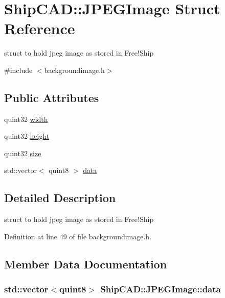 \hypertarget{structShipCAD_1_1JPEGImage}{\section{Ship\-C\-A\-D\-:\-:J\-P\-E\-G\-Image Struct Reference}
\label{structShipCAD_1_1JPEGImage}
}


struct to hold jpeg image as stored in Free!\-Ship  




{\ttfamily \#include $<$backgroundimage.\-h$>$}

\subsection*{Public Attributes}
\begin{DoxyCompactItemize}
\item 
quint32 \hyperlink{structShipCAD_1_1JPEGImage_aef2620e748540276be24c0275620870b}{width}
\item 
quint32 \hyperlink{structShipCAD_1_1JPEGImage_a35650ffa91785a63ba6f31cd87e208a2}{height}
\item 
quint32 \hyperlink{structShipCAD_1_1JPEGImage_a7e28010a6fb1d0c2926f8381b2e29931}{size}
\item 
std\-::vector$<$ quint8 $>$ \hyperlink{structShipCAD_1_1JPEGImage_aa1ec94e32147a6e39de7809b45604e21}{data}
\end{DoxyCompactItemize}


\subsection{Detailed Description}
struct to hold jpeg image as stored in Free!\-Ship 

Definition at line 49 of file backgroundimage.\-h.



\subsection{Member Data Documentation}
\hypertarget{structShipCAD_1_1JPEGImage_aa1ec94e32147a6e39de7809b45604e21}{
\subsubsection[{data}]{\setlength{\rightskip}{0pt plus 5cm}std\-::vector$<$quint8$>$ Ship\-C\-A\-D\-::\-J\-P\-E\-G\-Image\-::data}}\label{structShipCAD_1_1JPEGImage_aa1ec94e32147a6e39de7809b45604e21}



